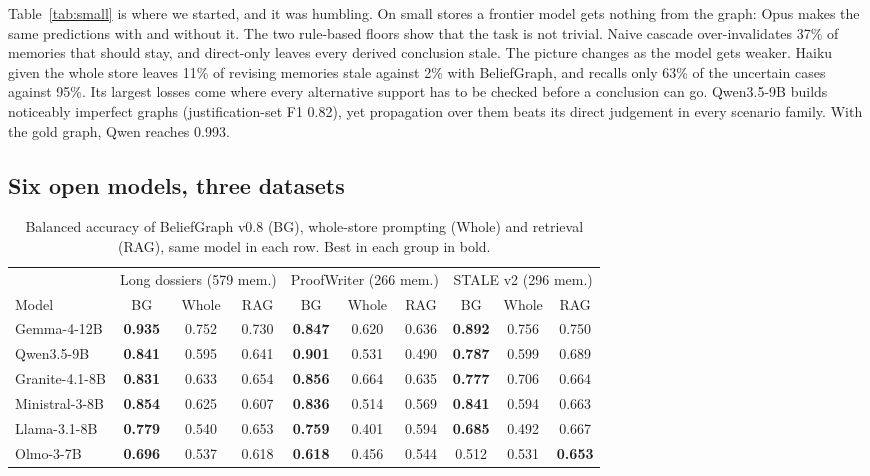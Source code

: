 \documentclass[conference]{IEEEtran}
\begin{document}
Table~\ref{tab:small} is where we started, and it was humbling. On small stores a frontier model gets nothing from the graph: Opus makes the same predictions with and without it. The two rule-based floors show that the task is not trivial. Naive cascade over-invalidates 37\% of memories that should stay, and direct-only leaves every derived conclusion stale. The picture changes as the model gets weaker. Haiku given the whole store leaves 11\% of revising memories stale against 2\% with BeliefGraph, and recalls only 63\% of the uncertain cases against 95\%. Its largest losses come where every alternative support has to be checked before a conclusion can go. Qwen3.5-9B builds noticeably imperfect graphs (justification-set F1 0.82), yet propagation over them beats its direct judgement in every scenario family. With the gold graph, Qwen reaches 0.993.

\subsection{Six open models, three datasets}

\begin{table}[t]
\caption{Balanced accuracy of BeliefGraph v0.8 (BG), whole-store prompting (Whole) and retrieval (RAG), same model in each row. Best in each group in bold.}
\label{tab:ladder}
\centering
\footnotesize
\begin{tabular}{@{}lccc@{\hspace{14pt}}ccc@{\hspace{14pt}}ccc@{}}
\toprule
& \multicolumn{3}{c}{Long dossiers (579 mem.)} & \multicolumn{3}{c}{ProofWriter (266 mem.)} & \multicolumn{3}{c}{STALE v2 (296 mem.)} \\
\cmidrule(r{14pt}){2-4}\cmidrule(r{14pt}){5-7}\cmidrule{8-10}
Model & BG & Whole & RAG & BG & Whole & RAG & BG & Whole & RAG \\
\midrule
Gemma-4-12B & \textbf{0.935} & 0.752 & 0.730 & \textbf{0.847} & 0.620 & 0.636 & \textbf{0.892} & 0.756 & 0.750 \\
Qwen3.5-9B & \textbf{0.841} & 0.595 & 0.641 & \textbf{0.901} & 0.531 & 0.490 & \textbf{0.787} & 0.599 & 0.689 \\
Granite-4.1-8B & \textbf{0.831} & 0.633 & 0.654 & \textbf{0.856} & 0.664 & 0.635 & \textbf{0.777} & 0.706 & 0.664 \\
Ministral-3-8B & \textbf{0.854} & 0.625 & 0.607 & \textbf{0.836} & 0.514 & 0.569 & \textbf{0.841} & 0.594 & 0.663 \\
Llama-3.1-8B & \textbf{0.779} & 0.540 & 0.653 & \textbf{0.759} & 0.401 & 0.594 & \textbf{0.685} & 0.492 & 0.667 \\
Olmo-3-7B & \textbf{0.696} & 0.537 & 0.618 & \textbf{0.618} & 0.456 & 0.544 & 0.512 & 0.531 & \textbf{0.653} \\
\bottomrule
\end{tabular}
\end{table}
\end{document}
